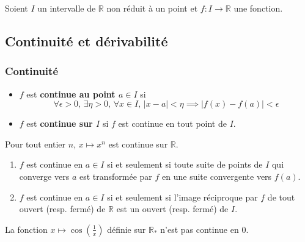 




	Soient $I$ un intervalle de $\mathbb{R}$ non réduit à un point et $f : I \rightarrow \mathbb{R}$ une fonction.

	\subsection{Continuité et dérivabilité}

	\subsubsection{Continuité}


	\begin{definition}
		\begin{itemize}
			\item $f$ est \textbf{continue au point $a \in I$} si
			\[ \forall \epsilon > 0, \, \exists \eta > 0, \, \forall x \in I, \, \vert x - a \vert < \eta \implies \vert f(x) - f(a) \vert < \epsilon \]
			\item $f$ est \textbf{continue sur $I$} si $f$ est continue en tout point de $I$.
		\end{itemize}
	\end{definition}

	\begin{example}
		Pour tout entier $n$, $x \mapsto x^n$ est continue sur $\mathbb{R}$.
	\end{example}

	\begin{theorem}
		\begin{enumerate}[label=(\roman*)]
			\item $f$ est continue en $a \in I$ si et seulement si toute suite de points de $I$ qui converge vers $a$ est transformée par $f$ en une suite convergente vers $f(a)$.
			\item $f$ est continue en $a \in I$ si et seulement si l'image réciproque par $f$ de tout ouvert (resp. fermé) de $\mathbb{R}$ est un ouvert (resp. fermé) de $I$.
		\end{enumerate}
	\end{theorem}

	\begin{example}
		La fonction $x \mapsto \cos \left( \frac{1}{x} \right)$ définie sur $\mathbb{R}_*$ n'est pas continue en $0$.
	\end{example}

